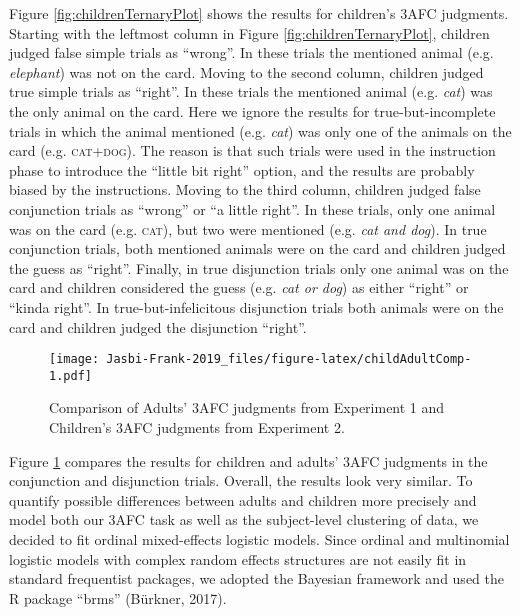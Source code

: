 \documentclass[,man,floatsintext]{apa6}
\begin{document}
Figure \ref{fig:childrenTernaryPlot} shows the results for children's 3AFC judgments. Starting with the leftmost column in Figure \ref{fig:childrenTernaryPlot}, children judged false simple trials as \enquote{wrong}. In these trials the mentioned animal (e.g. \emph{elephant}) was not on the card. Moving to the second column, children judged true simple trials as \enquote{right}. In these trials the mentioned animal (e.g. \emph{cat}) was the only animal on the card. Here we ignore the results for true-but-incomplete trials in which the animal mentioned (e.g. \emph{cat}) was only one of the animals on the card (e.g. \textsc{cat+dog}). The reason is that such trials were used in the instruction phase to introduce the \enquote{little bit right} option, and the results are probably biased by the instructions. Moving to the third column, children judged false conjunction trials as \enquote{wrong} or \enquote{a little right}. In these trials, only one animal was on the card (e.g. \textsc{cat}), but two were mentioned (e.g. \emph{cat and dog}). In true conjunction trials, both mentioned animals were on the card and children judged the guess as \enquote{right}. Finally, in true disjunction trials only one animal was on the card and children considered the guess (e.g. \emph{cat or dog}) as either \enquote{right} or \enquote{kinda right}. In true-but-infelicitous disjunction trials both animals were on the card and children judged the disjunction \enquote{right}.

\begin{figure}
\centering
\texttt{[image: Jasbi-Frank-2019\_files/figure-latex/childAdultComp-1.pdf]}
\caption{\label{fig:childAdultComp}Comparison of Adults' 3AFC judgments from Experiment 1 and Children's 3AFC judgments from Experiment 2.}
\end{figure}

Figure \ref{fig:childAdultComp} compares the results for children and adults' 3AFC judgments in the conjunction and disjunction trials. Overall, the results look very similar. To quantify possible differences between adults and children more precisely and model both our 3AFC task as well as the subject-level clustering of data, we decided to fit ordinal mixed-effects logistic models. Since ordinal and multinomial logistic models with complex random effects structures are not easily fit in standard frequentist packages, we adopted the Bayesian framework and used the R package \enquote{brms} (Bürkner, 2017).
\end{document}
